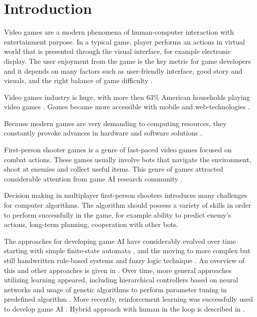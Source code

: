 \section{Introduction}

Video games are a modern phenomena of human-computer interaction with entertainment purpose.
In a typical game, player performs an actions in virtual world that is presented through the visual interface, for example electronic display.
The user enjoyment from the game is the key metric for game developers and it depends on many factors such as user-friendly interface,
good story and visuals, and the right balance of game difficulty \cite{VideoGameEnjoyment}.

Video games industry is huge, with more then 63\% American households playing video games \cite{VideoGameFacts}.
Games became more accessible with mobile and web-technologies \cite{ToBeDone}.


Because modern games are very demanding to computing resources, they constantly provoke advances in hardware and software solutions \cite{ToBeDone}.

First-person shooter games is a genre of fast-paced video games focused on combat actions.
These games usually involve bots that navigate the environment, shoot at enemies and collect useful items.
This genre of games attracted considerable attention from game AI research community \cite{MLinFPS}.

Decision making in multiplayer first-person shooters introduces many challenges for computer algorithms.
The algorithm should possess a variety of skills in order to perform successfully in the game, 
for example ability to predict enemy's actions, long-term planning, cooperation with other bots.


The approaches for developing game AI have considerably evolved over time starting with simple finite-state automata \cite{ToBeDone}, and the moving to more complex but still handwritten rule-based systems \cite{RuleBased} and fuzzy logic technique \cite{FuzzyLogic}. An overview of this and other approaches is given in \cite{AITechniques}.
Over time, more general approaches utilizing learning appeared,
including hierarchical controllers based on neural networks \cite{HierarchicalController} and usage of genetic algorithms to perform parameter tuning in predefined algorithm \cite{GeneticTuning}.
More recently, reinforcement learning was successfully used to develop game AI \cite{RLGallagher}.
Hybrid approach with human in the loop is described in \cite{InteractiveGallagher}.

